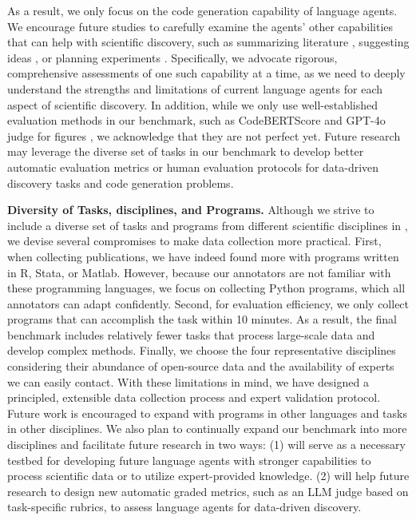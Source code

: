 As a result, we only focus on the code generation capability of language agents. 
We encourage future studies to carefully examine the agents' other capabilities that can help with scientific discovery, such as summarizing literature \citep{lin2024papercopilotselfevolvingefficient}, suggesting ideas \citep{si2024llmsgeneratenovelresearch}, or planning experiments \citep{coscientist}.
Specifically, we advocate rigorous, comprehensive assessments of one such capability at a time, as we need to deeply understand the strengths and limitations of current language agents for each aspect of scientific discovery.
In addition, while we only use well-established evaluation methods in our benchmark, such as CodeBERTScore \citep{zhou-etal-2023-codebertscore} and GPT-4o judge for figures \citep{wu2024plot2codecomprehensivebenchmarkevaluating, yang2024matplotagentmethodevaluationllmbased}, we acknowledge that they are not perfect yet.
Future research may leverage the diverse set of tasks in our benchmark to develop better automatic evaluation metrics or human evaluation protocols for data-driven discovery tasks and code generation problems.
%

%
\textbf{Diversity of Tasks, disciplines, and Programs.}
Although we strive to include a diverse set of tasks and programs from different scientific disciplines in \bench, we devise several compromises to make data collection more practical.
First, when collecting publications, we have indeed found more with programs written in R, Stata, or Matlab.
However, because our annotators are not familiar with these programming languages, we focus on collecting Python programs, which all annotators can adapt confidently.
Second, for evaluation efficiency, we only collect programs that can accomplish the task within 10 minutes.
As a result, the final benchmark includes relatively fewer tasks that process large-scale data and develop complex methods.
Finally, we choose the four representative disciplines considering their abundance of open-source data and the availability of experts we can easily contact.
With these limitations in mind, we have designed a principled, extensible data collection process and expert validation protocol. 
Future work is encouraged to expand \bench with programs in other languages and tasks in other disciplines.
We also plan to continually expand our benchmark into more disciplines and facilitate future research in two ways:
(1) \bench will serve as a necessary testbed for developing future language agents with stronger capabilities to process scientific data or to utilize expert-provided knowledge. 
(2) \bench will help future research to design new automatic graded metrics, such as an LLM judge based on task-specific rubrics, to assess language agents for data-driven discovery.
%


